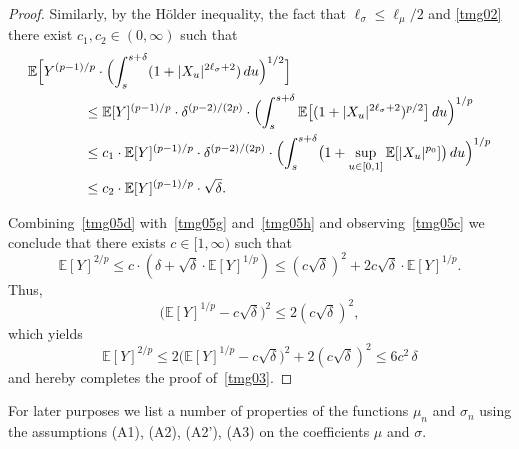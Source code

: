 \documentclass[11pt]{amsart}
\newcommand{\EE}{{\mathbb E}}
\theoremstyle{plain}
\theoremstyle{definition}
\begin{document}
\begin{proof}
Similarly, by  the H\"older inequality, the fact that $\ell_\sigma\le \ell_\mu/2$ and \eqref{tmg02} there exist $c_1, c_2\in (0,\infty)$ such that
\begin{equation}\label{tmg05h}
\begin{aligned}
& \EE\Bigl[Y^{(p-1)/p}\cdot \Bigl(\int_s^{s+\delta} (1+|X_u|^{2\ell_\sigma+2})\, du\Bigr)^{1/2}\Bigr]\\
& \qquad\qquad \le \EE[Y]^{(p-1)/p} \cdot\delta^{(p-2)/(2p)}\cdot \Bigl( \int_s^{s+\delta}\EE\bigl[ (1+|X_u|^{2\ell_\sigma+2})^{p/2}\bigr]\, du\Bigr)^{1/p}\\
& \qquad\qquad \le c_1\cdot  \EE[Y]^{(p-1)/p} \cdot\delta^{(p-2)/(2p)}\cdot \Bigl( \int_s^{s+\delta}\bigl(1+ \sup_{u\in [0,1]}\EE[|X_u|^{p_0}]\bigr)\, du\Bigr)^{1/p}\\
& \qquad\qquad \le c_2\cdot \EE[Y]^{(p-1)/p} \cdot \sqrt \delta.
\end{aligned}
\end{equation}


Combining~\eqref{tmg05d} with~\eqref{tmg05g} and~\eqref{tmg05h} and observing~\eqref{tmg05c} we conclude that there exists $c\in [1,\infty)$ such that
\begin{equation}\label{tmg05i}
\EE[Y]^{2/p} \le c\cdot ( \delta +   \sqrt \delta\cdot \EE[Y]^{1/p}) \le (c \sqrt \delta)^2 +  2c\sqrt \delta\cdot\EE[Y]^{1/p}.
\end{equation}
 Thus,
\[
\bigl(\EE[Y]^{1/p} - c \sqrt\delta\bigr)^2 \le 2(c\sqrt\delta)^2,
\]
which yields
\[
\EE[Y]^{2/p} \le 2\bigl(\EE[Y]^{1/p} - c\sqrt\delta\bigr)^2  + 2(c\sqrt\delta)^2 \le 6 c^2\, \delta
\]
and hereby completes the proof of~\eqref{tmg03}.
\end{proof}

For later purposes we list a number of properties of the functions $\mu_n$ and $\sigma_n$ using the assumptions (A1), (A2), (A2'), (A3) on the coefficients $\mu$ and $\sigma$.
\end{document}
